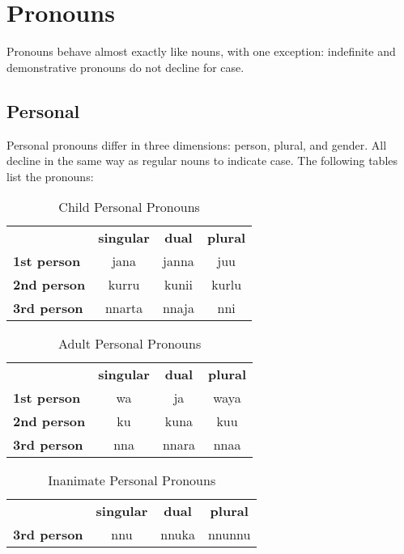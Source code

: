 \chapter{Pronouns}

Pronouns behave almost exactly like nouns, with one exception: indefinite and
demonstrative pronouns do not decline for case.

\section{Personal}

Personal pronouns differ in three dimensions: person, plural, and gender. All
decline in the same way as regular nouns to indicate case. The following tables
list the pronouns:

\begin{table}[h]
\centering
\begin{tabular}{lccc}
 & \textbf{singular} & \textbf{dual} & \textbf{plural}\\
 \textbf{1st person} & jana & janna & juu\\
 \textbf{2nd person} & kurru & kunii & kurlu\\
 \textbf{3rd person} & nnarta & nnaja & nni\\
\end{tabular}
\caption{Child Personal Pronouns}
\end{table}

\begin{table}[h]
\centering
\begin{tabular}{lccc}
 & \textbf{singular} & \textbf{dual} & \textbf{plural}\\
 \textbf{1st person} & wa & ja & waya\\
 \textbf{2nd person} & ku & kuna & kuu\\
 \textbf{3rd person} & nna & nnara & nnaa\\
\end{tabular}
\caption{Adult Personal Pronouns}
\end{table}

\begin{table}[h]
\centering
\begin{tabular}{lccc}
 & \textbf{singular} & \textbf{dual} & \textbf{plural}\\
 \textbf{3rd person} & nnu & nnuka & nnunnu\\
\end{tabular}
\caption{Inanimate Personal Pronouns}
\end{table}

